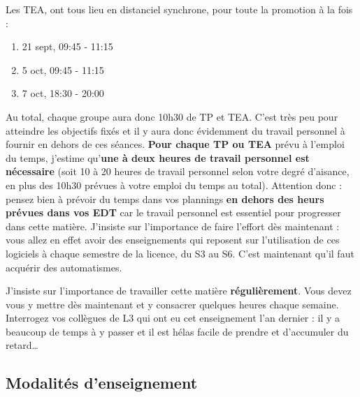 \documentclass[
  a4paper,
  DIV=11,
  numbers=noendperiod,
  oneside]{scrreprt}
\providecommand{\tightlist}{%
  \setlength{\itemsep}{0pt}\setlength{\parskip}{0pt}}\usepackage{longtable,booktabs,array}
\begin{document}
Les TEA, ont tous lieu en distanciel synchrone, pour toute la promotion
à la fois :

\begin{enumerate}
\def\labelenumi{\arabic{enumi}.}
\tightlist
\item
  21 sept, 09:45 - 11:15
\item
  5 oct, 09:45 - 11:15
\item
  7 oct, 18:30 - 20:00
\end{enumerate}

Au total, chaque groupe aura donc 10h30 de TP et TEA. C'est très peu
pour atteindre les objectifs fixés et il y aura donc évidemment du
travail personnel à fournir en dehors de ces séances. \textbf{Pour
chaque TP ou TEA} prévu à l'emploi du temps, j'estime qu'\textbf{une à
deux heures de travail personnel est nécessaire} (soit 10 à 20 heures de
travail personnel selon votre degré d'aisance, en plus des 10h30 prévues
à votre emploi du temps au total). Attention donc : pensez bien à
prévoir du temps dans vos plannings \textbf{en dehors des heurs prévues
dans vos EDT} car le travail personnel est essentiel pour progresser
dans cette matière. J'insiste sur l'importance de faire l'effort dès
maintenant : vous allez en effet avoir des enseignements qui reposent
sur l'utilisation de ces logiciels à chaque semestre de la licence, du
S3 au S6. C'est maintenant qu'il faut acquérir des automatismes.

\begin{tcolorbox}[enhanced jigsaw, colbacktitle=quarto-callout-warning-color!10!white, left=2mm, leftrule=.75mm, titlerule=0mm, bottomtitle=1mm, colback=white, breakable, arc=.35mm, bottomrule=.15mm, toprule=.15mm, toptitle=1mm, opacitybacktitle=0.6, title=\textcolor{quarto-callout-warning-color}{\faExclamationTriangle}\hspace{0.5em}{Travaillez régulièrement !}, coltitle=black, rightrule=.15mm, opacityback=0, colframe=quarto-callout-warning-color-frame]

J'insiste sur l'importance de travailler cette matière
\textbf{régulièrement}. Vous devez vous y mettre dès maintenant et y
consacrer quelques heures chaque semaine. Interrogez vos collègues de L3
qui ont eu cet enseignement l'an dernier : il y a beaucoup de temps à y
passer et il est hélas facile de prendre et d'accumuler du
retard\ldots{}

\end{tcolorbox}

\subsection*{Modalités d'enseignement}\label{modalituxe9s-denseignement}
\end{document}
